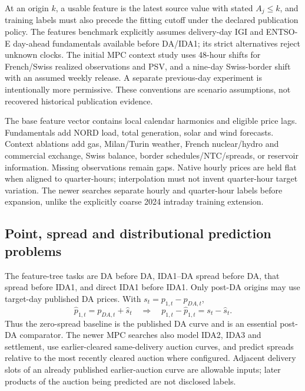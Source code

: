 At an origin $k$, a usable feature is the latest source value with stated
$A_j\le k$, and training labels must also precede the fitting cutoff under the
declared publication policy. The features benchmark explicitly assumes
delivery-day IGI and ENTSO-E day-ahead fundamentals available before DA/IDA1;
its strict alternatives reject unknown clocks. The initial MPC context study
uses 48-hour shifts for French/Swiss realized observations and PSV, and a
nine-day Swiss-border shift with an assumed weekly release. A separate
previous-day experiment is intentionally more permissive. These conventions
are scenario assumptions, not recovered historical publication evidence.

The base feature vector contains local calendar harmonics and eligible price
lags. Fundamentals add NORD load, total generation, solar and wind forecasts.
Context ablations add gas, Milan/Turin weather, French nuclear/hydro and
commercial exchange, Swiss balance, border schedules/NTC/spreads, or reservoir
information. Missing observations remain gaps. Native hourly prices are held
flat when aligned to quarter-hours; interpolation must not invent quarter-hour
target variation. The newer searches separate hourly and quarter-hour labels
before expansion, unlike the explicitly coarse 2024 intraday training extension.

\subsection{Point, spread and distributional prediction problems}
The feature-tree tasks are DA before DA, IDA1--DA spread before DA, that spread
before IDA1, and direct IDA1 before IDA1. Only post-DA origins may use target-day
published DA prices. With $s_t=p_{1,t}-p_{DA,t}$,
\begin{equation}
 \hat p_{1,t}=p_{DA,t}+\hat s_t
 \quad\Longrightarrow\quad
 p_{1,t}-\hat p_{1,t}=s_t-\hat s_t.
\end{equation}
Thus the zero-spread baseline is the published DA curve and is an essential
post-DA comparator. The newer MPC searches also model IDA2, IDA3 and settlement,
use earlier-cleared same-delivery auction curves, and predict spreads relative
to the most recently cleared auction where configured. Adjacent delivery slots
of an already published earlier-auction curve are allowable inputs; later
products of the auction being predicted are not disclosed labels.

